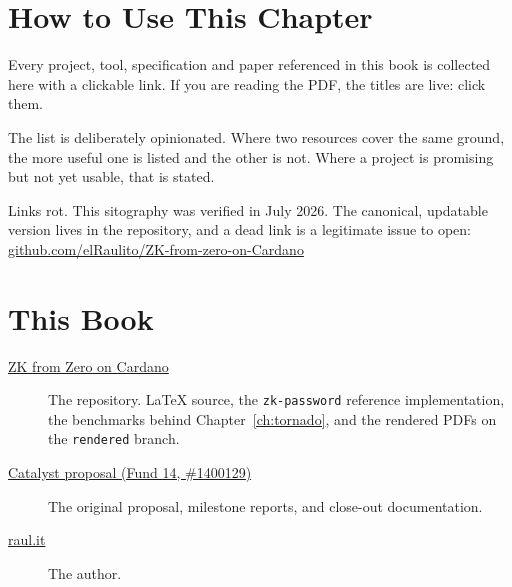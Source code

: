 
\section{How to Use This Chapter} \label{sec:sito-how}

Every project, tool, specification and paper referenced in this book is
collected here with a clickable link. If you are reading the PDF, the titles
are live: click them.

The list is deliberately opinionated. Where two resources cover the same
ground, the more useful one is listed and the other is not. Where a project is
promising but not yet usable, that is stated.

\begin{remark}
Links rot. This sitography was verified in July 2026. The canonical, updatable
version lives in the repository, and a dead link is a legitimate issue to
open:
\href{https://github.com/elRaulito/ZK-from-zero-on-Cardano}{github.com/elRaulito/ZK-from-zero-on-Cardano}
\end{remark}

\section{This Book} \label{sec:sito-book}

\begin{description}
  \item[\href{https://github.com/elRaulito/ZK-from-zero-on-Cardano}{ZK from Zero on Cardano}]
    The repository. LaTeX source, the \texttt{zk-password} reference
    implementation, the benchmarks behind Chapter~\ref{ch:tornado}, and the
    rendered PDFs on the \texttt{rendered} branch.

  \item[\href{https://projectcatalyst.io/funds/14/cardano-open-ecosystem/zk-from-zero-on-cardano-ebook-by-elraulito}{Catalyst proposal (Fund 14, \#1400129)}]
    The original proposal, milestone reports, and close-out documentation.

  \item[\href{https://www.raul.it/}{raul.it}]
    The author.
\end{description}

